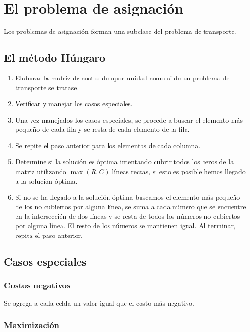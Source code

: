 	\chapter{El problema de asignación}
	Los problemas de asignación forman una subclase del problema de transporte.
	
	\section{El método Húngaro}
	
	\begin{enumerate}
		\item Elaborar la matriz de costos de oportunidad como si de un problema de transporte se tratase.
		\item Verificar y manejar los casos especiales.
		\item Una vez manejados los casos especiales, se procede a buscar el elemento más pequeño de cada fila y se resta de cada elemento de la fila.
		\item Se repite el paso anterior para los elementos de cada columna.
		\item Determine si la solución es óptima intentando cubrir todos los ceros de la matriz utilizando $\max(R,C)$ líneas rectas, si esto es posible hemos llegado a la solución óptima.
		
		\item Si no se ha llegado a la solución óptima buscamos el elemento más pequeño de los no cubiertos por alguna línea, se suma a cada número que se encuentre en la intersección de dos líneas y se resta de todos los números no cubiertos por alguna línea. El resto de los números se mantienen igual. Al terminar, repita el paso anterior.
	\end{enumerate}
	
	\section{Casos especiales}
	
	\subsection{Costos negativos}
	
	Se agrega a cada celda un valor igual que el costo más negativo.
	
	\subsection{Maximización}
	
